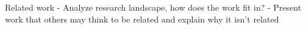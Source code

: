 Related work
- Analyze research landscape, how does the work fit in?
- Present work that others may think to be related and explain why it
  isn't related

\cite{1176982}
